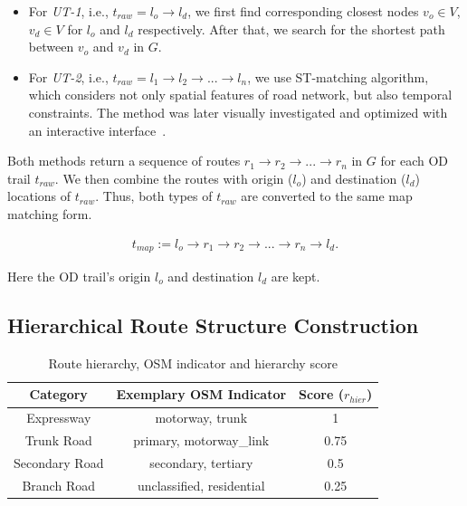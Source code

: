 \begin{itemize}

\item
For \textit{UT-1}, i.e., $t_{raw} = l_o \rightarrow l_d$, we first find corresponding closest nodes $v_o \in V$, $v_d \in V$ for $l_o$ and $l_d$ respectively.
After that, we search for the shortest path between $v_o$ and $v_d$ in $G$.

\item
For \textit{UT-2}, i.e., $t_{raw} = l_1 \rightarrow l_2 \rightarrow ... \rightarrow l_n$, we use ST-matching algorithm, which considers not only spatial features of road network, but also temporal constraints.
The method was later visually investigated and optimized with an interactive interface~\cite{kruger_2018_visual}.
\end{itemize}

Both methods return a sequence of routes $r_1 \rightarrow r_2 \rightarrow ... \rightarrow r_n$ in $G$ for each OD trail $t_{raw}$.
We then combine the routes with origin ($l_o$) and destination ($l_d$) locations of $t_{raw}$.
Thus, both types of $t_{raw}$ are converted to the same map matching form. 

\vspace{-7mm}
\begin{equation}
  	\begin{aligned}
t_{map} := l_o \rightarrow r_1 \rightarrow r_2 \rightarrow ... \rightarrow r_n \rightarrow l_d.
 	\end{aligned}
\end{equation}
\vspace{-1mm}

Here the OD trail's origin $l_o$ and destination $l_d$ are kept.

\subsection{Hierarchical Route Structure Construction}
\label{ssec:hiera_road}

\begin{table}
	\centering
	\begin{tabular}{|c|c|c|}
	\hline
	Category & Exemplary OSM Indicator & Score ($r_{hier}$)  \\ \hline
	Expressway & motorway, trunk & 1 \\ \hline
	Trunk Road & primary, motorway\_link& 0.75 \\ \hline
	Secondary Road & secondary, tertiary & 0.5 \\ \hline
	Branch Road & unclassified, residential & 0.25 \\ \hline
	\end{tabular}
	\vspace{1mm}
	\caption{Route hierarchy, OSM indicator and hierarchy score} \label{tab:sometab}
	\label{table: road_score}
\vspace{-6mm}
\end{table}

